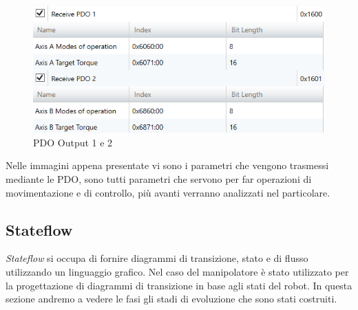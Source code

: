 \begin{figure}[ht]
\begin{center}
    \includegraphics[scale=0.7]{Immagini/Sperimentale/pdo12out.png}
    \caption{PDO Output 1 e 2}
\end{center}
\end{figure}
Nelle immagini appena presentate vi sono i parametri che vengono trasmessi mediante le PDO, sono tutti parametri che servono per far operazioni di movimentazione e di controllo, più avanti verranno analizzati nel particolare.
\subsection{Stateflow}
\textit{Stateflow} si occupa di fornire diagrammi di transizione, stato e di flusso utilizzando un linguaggio grafico. Nel caso del manipolatore è stato utilizzato per la progettazione di diagrammi di transizione in base agli stati del robot. In questa sezione andremo a vedere le fasi gli stadi di evoluzione che sono stati costruiti.
